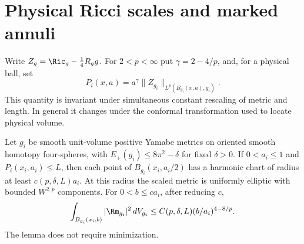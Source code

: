 \section{Physical Ricci scales and marked annuli}\label{sec:ricci-scales}

Write \(Z_g=\Ric_g-\tfrac14 R_g g\). For \(2<p<\infty\) put
\(\gamma=2-4/p\), and, for a physical ball, set
\[
 P_i(x,a)=a^\gamma\|Z_{g_i}\|_{L^p(B_{g_i}(x,a),g_i)}.
\]
This quantity is invariant under simultaneous constant rescaling of
metric and length. In general it changes under the conformal
transformation used to locate physical volume.

\begin{lemma}\label{lem:ricci-radius}
Let \(g_i\) be smooth unit-volume positive Yamabe metrics on oriented
smooth homotopy four-spheres, with \(E_+(g_i)\le8\pi^2-\delta\)
for fixed \(\delta>0\). If \(0<a_i\le1\) and \(P_i(x_i,a_i)\le L\),
then each point of \(B_{g_i}(x_i,a_i/2)\) has a harmonic chart of
radius at least \(c(p,\delta,L)a_i\). At this radius the scaled metric
is uniformly elliptic with bounded \(W^{2,p}\) components.
For \(0<b\le c a_i\), after reducing \(c\),
\begin{equation}\label{eq:ricci-mass}
 \int_{B_{g_i}(x_i,b)}|\Rm_{g_i}|^2\,dV_{g_i}
       \le C(p,\delta,L)(b/a_i)^{4-8/p}.
\end{equation}
The lemma does not require minimization.
\end{lemma}

